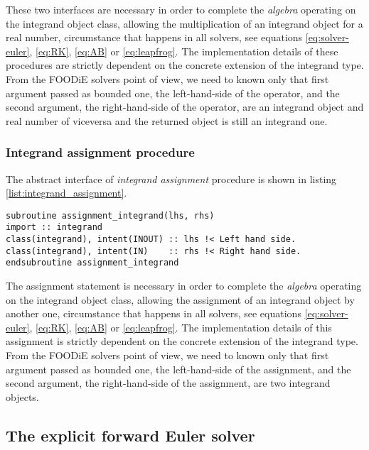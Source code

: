 These two interfaces are necessary in order to complete the \emph{algebra} operating on the integrand object class, allowing the multiplication of an integrand object for a real number, circumstance that happens in all solvers, see equations \ref{eq:solver-euler}, \ref{eq:RK}, \ref{eq:AB} or \ref{eq:leapfrog}. The implementation details of these procedures are strictly dependent on the concrete extension of the integrand type. From the FOODiE solvers point of view, we need to known only that first argument passed as bounded one, the left-hand-side of the operator, and the second argument, the right-hand-side of the operator, are an integrand object and real number of viceversa and the returned object is still an integrand one.

\subsubsection{Integrand assignment procedure}

The abstract interface of \emph{integrand assignment} procedure is shown in listing \ref{list:integrand_assignment}.

\begin{lstlisting}[firstnumber=1,style=code,caption={integrand assignment procedure interface},label={list:integrand_assignment}]
subroutine assignment_integrand(lhs, rhs)
import :: integrand
class(integrand), intent(INOUT) :: lhs !< Left hand side.
class(integrand), intent(IN)    :: rhs !< Right hand side.
endsubroutine assignment_integrand
\end{lstlisting}

The assignment statement is necessary in order to complete the \emph{algebra} operating on the integrand object class, allowing the assignment of an integrand object by another one, circumstance that happens in all solvers, see equations \ref{eq:solver-euler}, \ref{eq:RK}, \ref{eq:AB} or \ref{eq:leapfrog}. The implementation details of this assignment is strictly dependent on the concrete extension of the integrand type. From the FOODiE solvers point of view, we need to known only that first argument passed as bounded one, the left-hand-side of the assignment, and the second argument, the right-hand-side of the assignment, are two integrand objects.

\clearpage

\subsection{The explicit forward Euler solver}\label{subsec:solver_euler}

